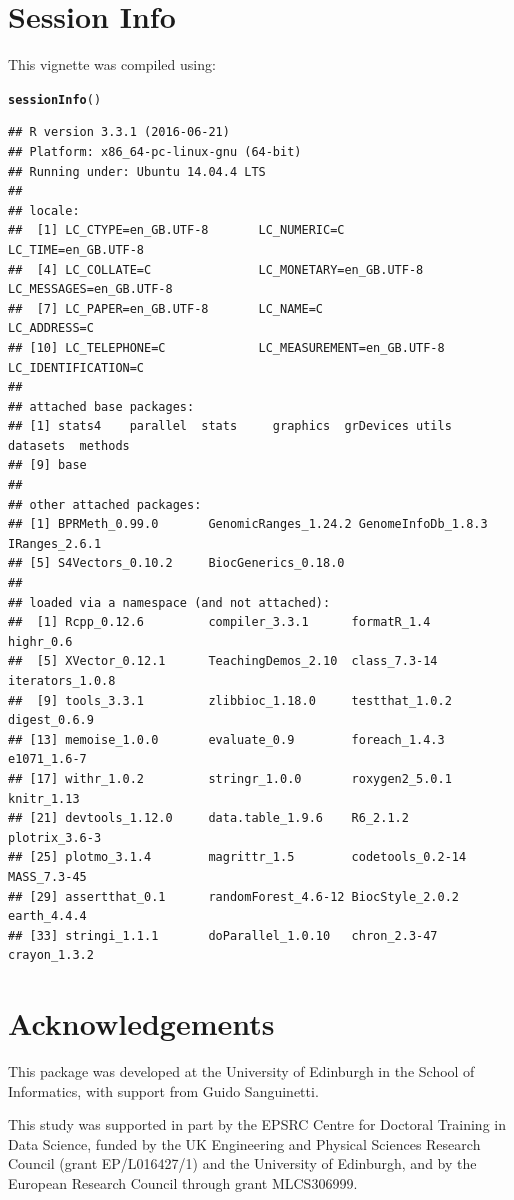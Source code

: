 \documentclass{article}\usepackage[]{graphicx}\usepackage[]{color}
\makeatletter
\newcommand{\hlstd}[1]{\textcolor[rgb]{0.345,0.345,0.345}{#1}}%
\newcommand{\hlkwd}[1]{\textcolor[rgb]{0.737,0.353,0.396}{\textbf{#1}}}%
\newenvironment{kframe}{%
 \def\at@end@of@kframe{}%
 \ifinner\ifhmode%
  \def\at@end@of@kframe{\end{minipage}}%
  \begin{minipage}{\columnwidth}%
 \fi\fi%
 \def\FrameCommand##1{\hskip\@totalleftmargin \hskip-\fboxsep
 \colorbox{shadecolor}{##1}\hskip-\fboxsep
     \hskip-\linewidth \hskip-\@totalleftmargin \hskip\columnwidth}%
 \MakeFramed {\advance\hsize-\width
   \@totalleftmargin\z@ \linewidth\hsize
   \@setminipage}}%
 {\par\unskip\endMakeFramed%
 \at@end@of@kframe}
\newenvironment{knitrout}{}{} %
\makeatother
\begin{document}
\section{Session Info}
This vignette was compiled using:
\begin{knitrout}
\color{fgcolor}\begin{kframe}
\begin{alltt}
\hlkwd{sessionInfo}\hlstd{()}
\end{alltt}
\begin{verbatim}
## R version 3.3.1 (2016-06-21)
## Platform: x86_64-pc-linux-gnu (64-bit)
## Running under: Ubuntu 14.04.4 LTS
## 
## locale:
##  [1] LC_CTYPE=en_GB.UTF-8       LC_NUMERIC=C               LC_TIME=en_GB.UTF-8       
##  [4] LC_COLLATE=C               LC_MONETARY=en_GB.UTF-8    LC_MESSAGES=en_GB.UTF-8   
##  [7] LC_PAPER=en_GB.UTF-8       LC_NAME=C                  LC_ADDRESS=C              
## [10] LC_TELEPHONE=C             LC_MEASUREMENT=en_GB.UTF-8 LC_IDENTIFICATION=C       
## 
## attached base packages:
## [1] stats4    parallel  stats     graphics  grDevices utils     datasets  methods  
## [9] base     
## 
## other attached packages:
## [1] BPRMeth_0.99.0       GenomicRanges_1.24.2 GenomeInfoDb_1.8.3   IRanges_2.6.1       
## [5] S4Vectors_0.10.2     BiocGenerics_0.18.0 
## 
## loaded via a namespace (and not attached):
##  [1] Rcpp_0.12.6         compiler_3.3.1      formatR_1.4         highr_0.6          
##  [5] XVector_0.12.1      TeachingDemos_2.10  class_7.3-14        iterators_1.0.8    
##  [9] tools_3.3.1         zlibbioc_1.18.0     testthat_1.0.2      digest_0.6.9       
## [13] memoise_1.0.0       evaluate_0.9        foreach_1.4.3       e1071_1.6-7        
## [17] withr_1.0.2         stringr_1.0.0       roxygen2_5.0.1      knitr_1.13         
## [21] devtools_1.12.0     data.table_1.9.6    R6_2.1.2            plotrix_3.6-3      
## [25] plotmo_3.1.4        magrittr_1.5        codetools_0.2-14    MASS_7.3-45        
## [29] assertthat_0.1      randomForest_4.6-12 BiocStyle_2.0.2     earth_4.4.4        
## [33] stringi_1.1.1       doParallel_1.0.10   chron_2.3-47        crayon_1.3.2
\end{verbatim}
\end{kframe}
\end{knitrout}

\section{Acknowledgements}
This package was developed at the University of Edinburgh in the School of Informatics, with support from Guido
Sanguinetti.

This study was supported in part by the EPSRC Centre for Doctoral Training in Data Science, funded by the UK Engineering and Physical Sciences Research Council (grant EP/L016427/1) and the University of Edinburgh, and by the European Research Council through grant MLCS306999.


\end{document}
